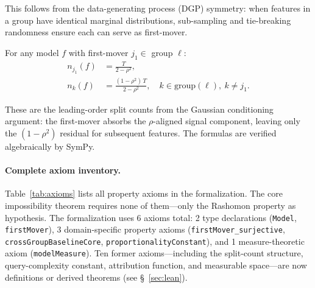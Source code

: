 \documentclass{jmlr}
\begin{document}
This follows from the data-generating process (DGP) symmetry: when features in a group have identical marginal distributions, sub-sampling and tie-breaking randomness ensure each can serve as first-mover.

\begin{axiom}
\label{ax:splits}
For any model $f$ with first-mover $j_1 \in$ group $\ell$:
\begin{align}
    n_{j_1}(f) &= \frac{T}{2 - \rho^2}, \label{eq:splits-first} \\
    n_{k}(f) &= \frac{(1-\rho^2)\,T}{2 - \rho^2}, \quad k \in \text{group}(\ell),\ k \neq j_1. \label{eq:splits-other}
\end{align}
\end{axiom}

These are the leading-order split counts from the Gaussian conditioning argument: the first-mover absorbs the $\rho$-aligned signal component, leaving only the $(1-\rho^2)$ residual for subsequent features.
The formulas are verified algebraically by SymPy.

\paragraph{Complete axiom inventory.}
Table~\ref{tab:axioms} lists all property axioms in the formalization.
The core impossibility theorem requires none of them---only the Rashomon property as hypothesis.
The formalization uses 6 axioms total: 2 type declarations (\texttt{Model}, \texttt{firstMover}), 3 domain-specific property axioms (\texttt{firstMover\_surjective}, \texttt{crossGroupBaselineCore}, \texttt{proportionalityConstant}), and 1 measure-theoretic axiom (\texttt{modelMeasure}). Ten former axioms---including the split-count structure, query-complexity constant, attribution function, and measurable space---are now definitions or derived theorems (see \S~\ref{sec:lean}).
\end{document}
